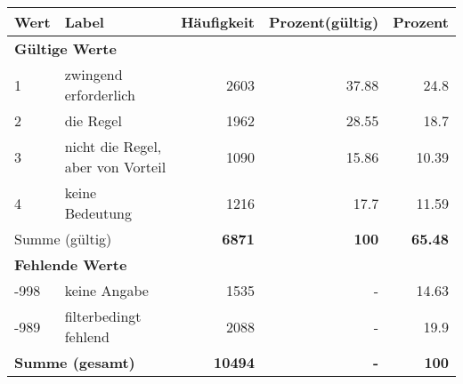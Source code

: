      \begin{longtable}{lXrrr}
     \toprule
     \textbf{Wert} & \textbf{Label} & \textbf{Häufigkeit} & \textbf{Prozent(gültig)} & \textbf{Prozent} \\
     \endhead
     \midrule
     \multicolumn{5}{l}{\textbf{Gültige Werte}}\\

     1 &
     \multicolumn{1}{X}{ zwingend erforderlich   } &


       \num{2603} &
       \num[round-mode=places,round-precision=2]{37,88} &
         \num[round-mode=places,round-precision=2]{24,8} \\

     2 &
     \multicolumn{1}{X}{ die Regel   } &


       \num{1962} &
       \num[round-mode=places,round-precision=2]{28,55} &
         \num[round-mode=places,round-precision=2]{18,7} \\

     3 &
     \multicolumn{1}{X}{ nicht die Regel, aber von Vorteil   } &


       \num{1090} &
       \num[round-mode=places,round-precision=2]{15,86} &
         \num[round-mode=places,round-precision=2]{10,39} \\

     4 &
     \multicolumn{1}{X}{ keine Bedeutung   } &


       \num{1216} &
       \num[round-mode=places,round-precision=2]{17,7} &
         \num[round-mode=places,round-precision=2]{11,59} \\
     \midrule
     \multicolumn{2}{l}{Summe (gültig)} &
       \textbf{\num{6871}} &
     \textbf{100} &
       \textbf{\num[round-mode=places,round-precision=2]{65,48}} \\
     \multicolumn{5}{l}{\textbf{Fehlende Werte}}\\
       -998 &
       keine Angabe &
         \num{1535} &
        - &
         \num[round-mode=places,round-precision=2]{14,63} \\
       -989 &
       filterbedingt fehlend &
         \num{2088} &
        - &
         \num[round-mode=places,round-precision=2]{19,9} \\
     \midrule
     \multicolumn{2}{l}{\textbf{Summe (gesamt)}} &
          \textbf{\num{10494}} &
        \textbf{-} &
        \textbf{100} \\
     \bottomrule
     \end{longtable}
     
